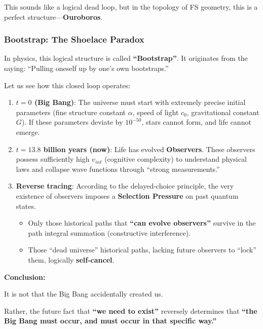 This sounds like a logical dead loop, but in the topology of FS geometry, this is a perfect structure---\textbf{Ouroboros}.

\subsubsection{Bootstrap: The Shoelace Paradox}

In physics, this logical structure is called \textbf{``Bootstrap''}. It originates from the saying: ``Pulling oneself up by one's own bootstraps.''

Let us see how this closed loop operates:

\begin{enumerate}
\item \textbf{$t=0$ (Big Bang)}: The universe must start with extremely precise initial parameters (fine structure constant $\alpha$, speed of light $c_0$, gravitational constant $G$). If these parameters deviate by $10^{-50}$, stars cannot form, and life cannot emerge.

\item \textbf{$t=13.8$ billion years (now)}: Life has evolved \textbf{Observers}. These observers possess sufficiently high $v_{int}$ (cognitive complexity) to understand physical laws and collapse wave functions through ``strong measurements.''

\item \textbf{Reverse tracing}: According to the delayed-choice principle, the very existence of observers imposes a \textbf{Selection Pressure} on past quantum states.

\begin{itemize}
\item Only those historical paths that \textbf{``can evolve observers''} survive in the path integral summation (constructive interference).

\item Those ``dead universe'' historical paths, lacking future observers to ``lock'' them, logically \textbf{self-cancel}.
\end{itemize}
\end{enumerate}

\textbf{Conclusion:}

It is not that the Big Bang accidentally created us.

Rather, the future fact that \textbf{``we need to exist''} reversely determines that \textbf{``the Big Bang must occur, and must occur in that specific way.''}

